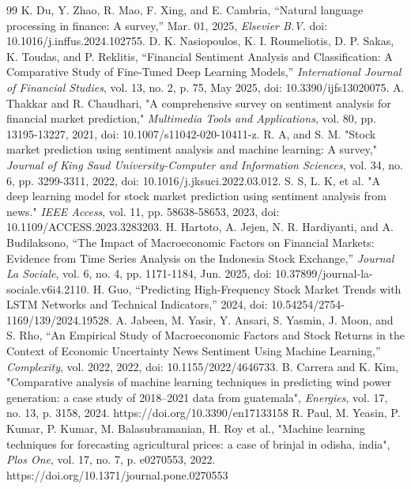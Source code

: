 \documentclass[conference]{IEEEtran}
\begin{document}
\begin{thebibliography}{99}
   K. Du, Y. Zhao, R. Mao, F. Xing, and E. Cambria, “Natural language processing in finance: A survey,” Mar. 01, 2025, \textit{Elsevier B.V.} doi: 10.1016/j.inffus.2024.102755.
   D. K. Nasiopoulos, K. I. Roumeliotis, D. P. Sakas, K. Toudas, and P. Reklitis, “Financial Sentiment Analysis and Classification: A Comparative Study of Fine-Tuned Deep Learning Models,” \textit{International Journal of Financial Studies}, vol. 13, no. 2, p. 75, May 2025, doi: 10.3390/ijfs13020075.
   A. Thakkar and R. Chaudhari, "A comprehensive survey on sentiment analysis for financial market prediction," \textit{Multimedia Tools and Applications}, vol. 80, pp. 13195-13227, 2021, doi: 10.1007/s11042-020-10411-z.
   R. A, and S. M. "Stock market prediction using sentiment analysis and machine learning: A survey," \textit{Journal of King Saud University-Computer and Information Sciences}, vol. 34, no. 6, pp. 3299-3311, 2022, doi: 10.1016/j.jksuci.2022.03.012.
   S. S, L. K, et al. "A deep learning model for stock market prediction using sentiment analysis from news." \textit{IEEE Access}, vol. 11, pp. 58638-58653, 2023, doi: 10.1109/ACCESS.2023.3283203.
   H. Hartoto, A. Jejen, N. R. Hardiyanti, and A. Budilaksono, “The Impact of Macroeconomic Factors on Financial Markets: Evidence from Time Series Analysis on the Indonesia Stock Exchange,” \textit{Journal La Sociale}, vol. 6, no. 4, pp. 1171-1184, Jun. 2025, doi: 10.37899/journal-la-sociale.v6i4.2110.
   H. Guo, “Predicting High-Frequency Stock Market Trends with LSTM Networks and Technical Indicators,” 2024, doi: 10.54254/2754-1169/139/2024.19528.
   A. Jabeen, M. Yasir, Y. Ansari, S. Yasmin, J. Moon, and S. Rho, “An Empirical Study of Macroeconomic Factors and Stock Returns in the Context of Economic Uncertainty News Sentiment Using Machine Learning,” \textit{Complexity}, vol. 2022, 2022, doi: 10.1155/2022/4646733.
   B. Carrera and K. Kim, "Comparative analysis of machine learning techniques in predicting wind power generation: a case study of 2018–2021 data from guatemala", \textit{Energies}, vol. 17, no. 13, p. 3158, 2024. https://doi.org/10.3390/en17133158
   R. Paul, M. Yeasin, P. Kumar, P. Kumar, M. Balasubramanian, H. Roy et al., "Machine learning techniques for forecasting agricultural prices: a case of brinjal in odisha, india", \textit{Plos One}, vol. 17, no. 7, p. e0270553, 2022. https://doi.org/10.1371/journal.pone.0270553

\end{thebibliography}
\end{document}
